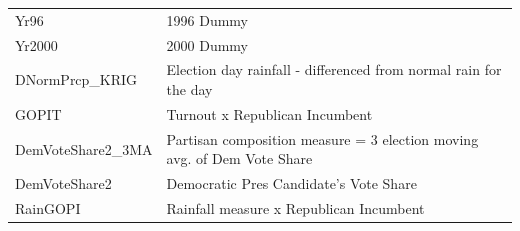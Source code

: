 \documentclass[]{book}
\begin{document}
\begin{longtable}[]{@{}ll@{}}
\begin{minipage}[t]{0.05\columnwidth}\raggedright\strut
Yr96\strut
\end{minipage} & \begin{minipage}[t]{0.89\columnwidth}\raggedright\strut
1996 Dummy\strut
\end{minipage}\tabularnewline
\begin{minipage}[t]{0.05\columnwidth}\raggedright\strut
Yr2000\strut
\end{minipage} & \begin{minipage}[t]{0.89\columnwidth}\raggedright\strut
2000 Dummy\strut
\end{minipage}\tabularnewline
\begin{minipage}[t]{0.05\columnwidth}\raggedright\strut
DNormPrcp\_KRIG\strut
\end{minipage} & \begin{minipage}[t]{0.89\columnwidth}\raggedright\strut
Election day rainfall - differenced from normal rain for the day\strut
\end{minipage}\tabularnewline
\begin{minipage}[t]{0.05\columnwidth}\raggedright\strut
GOPIT\strut
\end{minipage} & \begin{minipage}[t]{0.89\columnwidth}\raggedright\strut
Turnout x Republican Incumbent\strut
\end{minipage}\tabularnewline
\begin{minipage}[t]{0.05\columnwidth}\raggedright\strut
DemVoteShare2\_3MA\strut
\end{minipage} & \begin{minipage}[t]{0.89\columnwidth}\raggedright\strut
Partisan composition measure = 3 election moving avg. of Dem Vote
Share\strut
\end{minipage}\tabularnewline
\begin{minipage}[t]{0.05\columnwidth}\raggedright\strut
DemVoteShare2\strut
\end{minipage} & \begin{minipage}[t]{0.89\columnwidth}\raggedright\strut
Democratic Pres Candidate's Vote Share\strut
\end{minipage}\tabularnewline
\begin{minipage}[t]{0.05\columnwidth}\raggedright\strut
RainGOPI\strut
\end{minipage} & \begin{minipage}[t]{0.89\columnwidth}\raggedright\strut
Rainfall measure x Republican Incumbent\strut
\end{minipage}\tabularnewline

\end{longtable}
\end{document}
